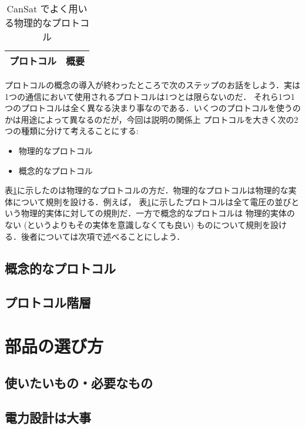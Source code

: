 \documentclass[dvipdfmx]{jsbook}
\begin{document}
\begin{table}[htbp]
  \centering
  \caption{CanSat でよく用いる物理的なプロトコル}
  \begin{tabular}{c|r} \hline
    プロトコル & 概要 \\ \hline
  \end{tabular}
  \label{tab:2.4.3-physical-protocols}
\end{table}

プロトコルの概念の導入が終わったところで次のステップのお話をしよう．実は1つの通信において使用されるプロトコルは1つとは限らないのだ．
それら1つ1つのプロトコルは全く異なる決まり事なのである．いくつのプロトコルを使うのかは用途によって異なるのだが，今回は説明の関係上
プロトコルを大きく次の2つの種類に分けて考えることにする:
\begin{itemize}
  \item 物理的なプロトコル
  \item 概念的なプロトコル
\end{itemize}
表\ref{tab:2.4.3-physical-protocols}に示したのは物理的なプロトコルの方だ．物理的なプロトコルは物理的な実体について規則を設ける．例えば，
表\ref{tab:2.4.3-physical-protocols}に示したプロトコルは全て電圧の並びという物理的実体に対しての規則だ．一方で概念的なプロトコルは
物理的実体のない (というよりもその実体を意識しなくても良い) ものについて規則を設ける．後者については次項で述べることにしよう．


\subsection{概念的なプロトコル}


\subsection{プロトコル階層}


\section{部品の選び方}
\label{sub:部品の選び方}

\subsection{使いたいもの・必要なもの}

\subsection{電力設計は大事}
\end{document}
